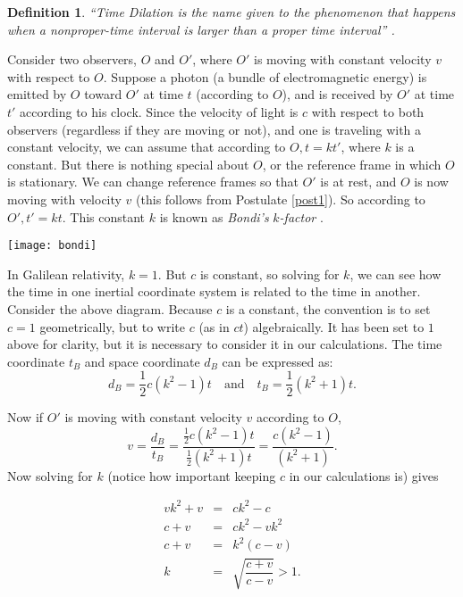 \documentclass[12pt]{article}
\theoremstyle{defn}
\newtheorem{defn}{Definition}
\theoremstyle{pf}
\newcommand{\0}{\emptyset}
\renewcommand{\-}{\setminus}
\begin{document}
\begin{defn} ``Time Dilation is the name given to the phenomenon that happens when a nonproper-time interval is larger than a proper time interval'' \cite{shadowitz}. \end{defn}

Consider two observers, $O$ and $O'$, where $O'$ is moving with constant velocity $v$ with respect to $O$. Suppose a photon (a bundle of electromagnetic energy) is emitted by $O$ toward $O'$ at time $t$ (according to $O$), and is received by $O'$ at time $t'$ according to his clock. Since the velocity of light is $c$ with respect to both observers (regardless if they are moving or not), and one is traveling with a constant velocity, we can assume that according to $O, t=kt'$, where $k$ is a constant. But there is nothing special about $O$, or the reference frame in which $O$ is stationary. We can change reference frames so that $O'$ is at rest, and $O$ is now moving with velocity $v$ (this follows from Postulate \ref{post1}). So according to $O', t'=kt$. This constant $k$ is known as \textit{Bondi's} $k$\textit{-factor} \cite{woodhouse}.

\begin{center}\texttt{[image: bondi]}\end{center}

In Galilean relativity, $k=1$. But $c$ is constant, so solving for $k$, we can see how the time in one inertial coordinate system is related to the time in another. Consider the above diagram. Because $c$ is a constant, the convention is to set $c=1$ geometrically, but to write $c$ (as in $ct$) algebraically. It has been set to $1$ above for clarity, but it is necessary to consider it in our calculations. The time coordinate $t_B$ and space coordinate $d_B$ can be expressed as: 
$$d_B=\dfrac{1}{2}c(k^2-1)t \quad \mbox{and} \quad 
t_B=\dfrac{1}{2}(k^2+1)t.$$

Now if $O'$ is moving with constant velocity $v$ according to $O$, $$v=\dfrac{d_B}{t_B}=\dfrac{\frac{1}{2}c(k^2-1)t}{\frac{1}{2}(k^2+1)t}=\dfrac{c(k^2-1)}{(k^2+1)}.$$ Now solving for $k$ (notice how important keeping $c$ in our calculations is) gives

\begin{eqnarray*}
 vk^2+v&=&ck^2-c\\
c+v&=&ck^2-vk^2\\
c+v&=&k^2(c-v)\\
k&=&\sqrt{\dfrac{c+v}{c-v}}>1.\\
\end{eqnarray*}
\end{document}
